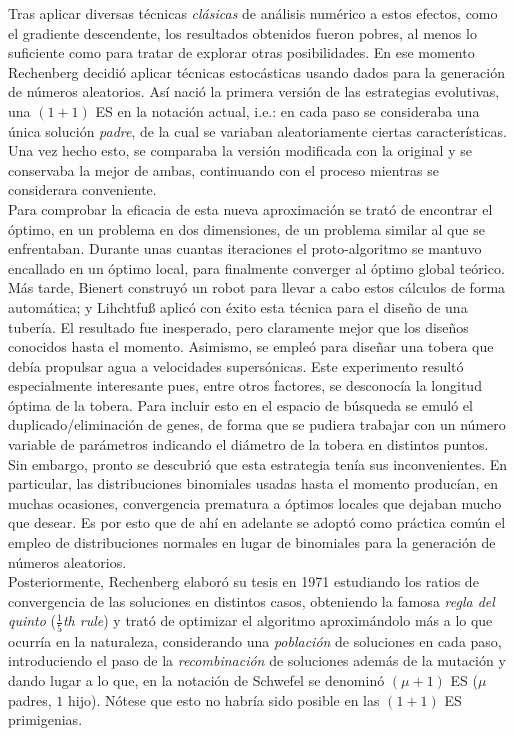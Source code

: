 \documentclass[12pt]{article} \usepackage[utf8x]{inputenc}
\begin{document}
Tras aplicar diversas técnicas \textit{clásicas} de análisis numérico a
estos efectos, como el gradiente descendente, los resultados obtenidos
fueron pobres, al menos lo suficiente como para tratar de explorar
otras posibilidades. En ese momento Rechenberg decidió aplicar
técnicas estocásticas usando dados para la generación de números
aleatorios. Así nació la primera versión de las estrategias
evolutivas, una $(1 + 1)$ ES en la notación actual, i.e.: en cada
paso se consideraba una única solución \textit{padre}, de la cual se
variaban aleatoriamente ciertas características. Una vez hecho esto,
se comparaba la versión modificada con la original y se conservaba la
mejor de ambas, continuando con el proceso mientras se considerara
conveniente. \\

Para comprobar la eficacia de esta nueva aproximación se trató de
encontrar el óptimo, en un problema en dos dimensiones, de un problema
similar al que se enfrentaban. Durante unas cuantas iteraciones el
proto-algoritmo se mantuvo encallado en un óptimo local, para
finalmente converger al óptimo global teórico. \\

Más tarde, Bienert construyó un robot para llevar a cabo estos
cálculos de forma automática; y Lihchtfu{\ss} aplicó con éxito esta técnica para
el diseño de una tubería. El resultado fue inesperado, pero claramente
mejor que los diseños conocidos hasta el momento. Asimismo, se empleó
para diseñar una tobera que debía propulsar agua a velocidades
supersónicas. Este experimento resultó especialmente interesante pues,
entre otros factores, se desconocía la longitud óptima de la
tobera. Para incluir esto en el espacio de búsqueda se emuló el
duplicado/eliminación de genes, de forma que se pudiera trabajar con un número
variable de parámetros indicando el diámetro de la tobera en distintos
puntos. \\

Sin embargo, pronto se descubrió que esta estrategia tenía sus
inconvenientes. En particular, las distribuciones binomiales usadas
hasta el momento producían, en muchas ocasiones, convergencia
prematura a óptimos locales que dejaban mucho que desear. Es por esto
que de ahí en adelante se adoptó como práctica común el empleo de
distribuciones normales en lugar de binomiales para la generación de
números aleatorios. \\

Posteriormente, Rechenberg elaboró su tesis en 1971 estudiando los
ratios de convergencia de las soluciones en distintos casos,
obteniendo la famosa \textit{regla del quinto} (\textit{$\frac 1 5$th
  rule}) y trató de optimizar el algoritmo aproximándolo más a lo que
ocurría en la naturaleza, considerando una \textit{población} de
soluciones en cada paso, introduciendo el paso de la
\textit{recombinación} de soluciones además de la mutación y dando
lugar a lo que, en la notación de Schwefel se denominó $(\mu + 1)$ ES
($\mu$ padres, $1$ hijo). Nótese que esto no habría sido posible en
las $(1 + 1)$ ES primigenias. \\
\end{document}
